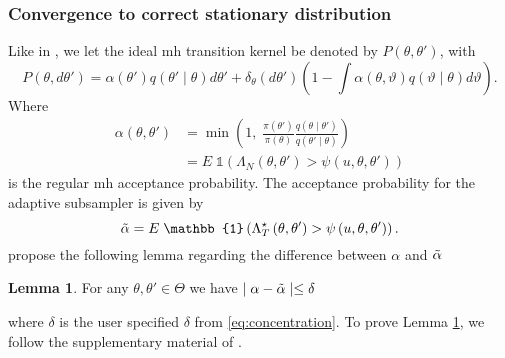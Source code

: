 \documentclass{article}
\theoremstyle{definition}
\newtheorem{lemma}[theorem]{Lemma}
\begin{document}
 \subsubsection{Convergence to correct stationary distribution}
 Like in \cite{Bardenet:2}, we let the ideal \gls{mh} transition kernel be denoted by 
 $P(\theta, \theta')$, with 
 \begin{equation*}
     P\left(\theta, d\theta'\right) = \alpha\left(\theta'\right)q\left(\theta'\mid\theta\right)d\theta' + \delta_{\theta}\left(d\theta'\right)\left(1 - \int\alpha\left(\theta, \vartheta\right)q\left(\vartheta\mid\theta\right) d\vartheta\right). 
 \end{equation*}
Where 
\begin{equation*}
\begin{split}
     \alpha\left(\theta, \theta'\right) &= \min\left(1,\; \frac{\pi\left(\theta'\right)}{\pi\left(\theta\right)}\frac{q\left(\theta\mid\theta'\right)}{q\left(\theta'\mid\theta\right)} \right) \\
     & = E \;\mathbb{1} \left(\Lambda_N\left(\theta, \theta'\right)> \psi \left(u, \theta, \theta' \right)\right)
\end{split}     
\end{equation*}
is the regular \gls{mh} acceptance probability. The acceptance probability for the adaptive subsampler is given by 
\begin{equation}
    \Tilde{\alpha} = E \; \mathbb{1} \left(\Lambda_T^{\star}\left(\theta, \theta'\right) > \psi\left(u, \theta, \theta'\right)\right). 
\end{equation} 
\cite{Bardenet:2} propose the following lemma regarding the difference between $\alpha$ and $\Tilde{\alpha}$
\begin{lemma}\label{lemma:acceptance}
For any $\theta, \theta' \in \Theta$ we have $\mid \alpha - \Tilde{\alpha} \mid \leq \delta$
\end{lemma}
where $\delta$ is the user specified $\delta$ from \eqref{eq:concentration}. To prove Lemma \ref{lemma:acceptance}, we follow the supplementary material of \cite{Bardenet:2}. 
\end{document}
